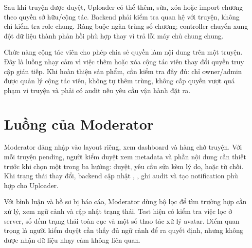 Sau khi truyện được duyệt, Uploader có thể thêm, sửa, xóa hoặc import chương theo quyền sở hữu/cộng tác. Backend phải kiểm tra quan hệ với truyện, không chỉ kiểm tra role chung. Ràng buộc  ngăn trùng số chương; controller chuyển xung đột dữ liệu thành phản hồi phù hợp thay vì trả lỗi máy chủ chung chung.

Chức năng cộng tác viên cho phép chia sẻ quyền làm nội dung trên một truyện. Đây là luồng nhạy cảm vì việc thêm hoặc xóa cộng tác viên thay đổi quyền truy cập gián tiếp. Khi hoàn thiện sản phẩm, cần kiểm tra đầy đủ: chỉ owner/admin được quản lý cộng tác viên, không tự thêm trùng, không cấp quyền vượt quá phạm vi truyện và phải có audit nếu yêu cầu vận hành đặt ra.

\section{Luồng của Moderator}

Moderator đăng nhập vào layout riêng, xem dashboard và hàng chờ truyện. Với mỗi truyện pending, người kiểm duyệt xem metadata và phần nội dung cần thiết trước khi chọn một trong ba hướng: duyệt, yêu cầu sửa kèm lý do, hoặc từ chối. Khi trạng thái thay đổi, backend cập nhật , , ghi audit và tạo notification phù hợp cho Uploader.

Với bình luận và hồ sơ bị báo cáo, Moderator dùng bộ lọc để tìm trường hợp cần xử lý, xem ngữ cảnh và cập nhật trạng thái. Test hiện có kiểm tra việc lọc ở server, số đếm trạng thái toàn cục và một số thao tác xử lý avatar. Điểm quan trọng là người kiểm duyệt cần thấy đủ ngữ cảnh để ra quyết định, nhưng không được nhận dữ liệu nhạy cảm không liên quan.

